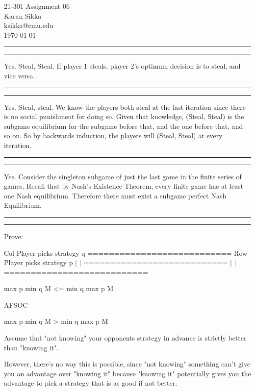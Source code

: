 \documentclass[11pt,letterpaper]{article}
\makeatletter
\newcommand{\question}[1] {\vspace{.25in} \hrule\vspace{0.5em}
\noindent{\bf #1} \vspace{0.5em}
\hrule \vspace{.10in}}
\newcommand{\myname}{Karan Sikka}
\newcommand{\myandrew}{ksikka@cmu.edu}
\newcommand{\myhwnum}{06}
\makeatother
\begin{document}
\medskip

\thispagestyle{plain}
\begin{center}                  %
{\Large 21-301 Assignment \myhwnum} \\
\myname \\
\myandrew \\
\today
\end{center}

\question{1.1}
Yes. Steal, Steal. If player 1 steals, player 2's optimum decision is to steal, and vice versa..

\question{1.2}
Yes. Steal, steal. We know the players both steal at the last iteration since there is no social punishment for doing so.
Given that knowledge, (Steal, Steal) is the subgame equilibrium for the subgame before that, and the one before that, and so on.
So by backwards induction, the players will (Steal, Steal) at every iteration.

\question{1.3}

Yes. Consider the singleton subgame of just the last game in the finite series of games.
Recall that by Nash's Existence Theorem, every finite game has at least one Nash equilibrium.
Therefore there must exist a subgame perfect Nash Equilibrium.

\question{2}

Prove:

                                Col Player picks strategy q
                                ===========================
Row Player picks strategy p     |
                                |
                                ===========================
                                |
                                |
                                ===========================

max p min q M <= min q max p M

AFSOC

max p min q M > min q max p M



Assume that "not knowing" your opponents strategy in advance
is strictly better than "knowing it".

However, there's no way this is possible,
since "not knowing" something
can't give you an advantage over "knowing it"
because "knowing it" potentially gives you the advantage
to pick a strategy that is as good if not better.
\end{document}
